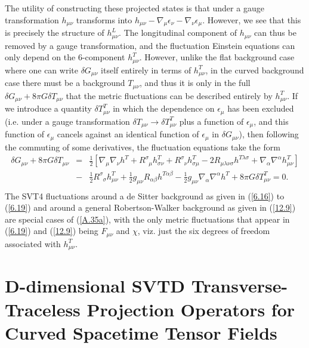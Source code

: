 The utility of constructing these projected states is that under a gauge transformation $h_{\mu\nu}$ transforms into $h_{\mu\nu}-\nabla_{\mu}\epsilon_{\nu}-\nabla_{\nu}\epsilon_{\mu}$. However, we see that this is precisely the structure of $h^{L}_{\mu\nu}$. The longitudinal component of $h_{\mu\nu}$ can thus be removed by a gauge transformation, and the fluctuation Einstein equations can only depend on the 6-component $h^{T}_{\mu\nu}$. However, unlike the flat background case where one can write $\delta G_{\mu\nu}$ itself entirely in terms of $h^T_{\mu\nu}$, in the curved background case there must be a background $T_{\mu\nu}$, and thus it is only in the full $\delta G_{\mu\nu}+8\pi G \delta T_{\mu\nu}$ that the metric fluctuations can be described entirely by $h^T_{\mu\nu}$. If we introduce a quantity $\delta T^T_{\mu\nu}$ in which the dependence on $\epsilon_{\mu}$ has been excluded (i.e. under a gauge transformation $\delta T_{\mu\nu}\rightarrow \delta T^T_{\mu\nu}$ plus a function of $\epsilon_{\mu}$, and this function of $\epsilon_{\mu}$ cancels against an identical function of $\epsilon_{\mu}$ in $\delta G_{\mu\nu}$), then following the commuting of some derivatives,  the fluctuation equations take the form \cite{mannheim_2005}
%
\begin{eqnarray} 
\delta G_{\mu\nu}+8\pi G \delta T_{\mu\nu}
&=&\frac{1}{2}[\nabla_{\mu}\nabla_{\nu}h^{T}
+R^{\sigma}_{\phantom{\sigma}\mu}h_{\sigma\nu}^{T}
+R^{\sigma}_{\phantom{\sigma}\nu}h_{\sigma\mu}^{T}
-2R_{\mu\lambda\nu\sigma}h^{T\lambda\sigma}
+\nabla_{\alpha}\nabla^{\alpha}h_{\mu\nu}^{T}]
\nonumber \\
&-&\frac{1}{2}R^{\sigma}_{\phantom{\sigma}\sigma}h^{T}_{\mu\nu}
+\frac{1}{ 2}g_{\mu\nu}R_{\alpha\beta}h^{T\alpha\beta}
-\frac{1}{2}g_{\mu\nu}\nabla_{\alpha}\nabla^{\alpha}h^{T}
+8\pi G \delta T^T_{\mu\nu}=0.
\nonumber\\
\label{A.35a}
\end{eqnarray}
% 
The SVT4 fluctuations around a de Sitter background as given in (\ref{6.16}) to (\ref{6.19}) and around a general Robertson-Walker background as given in (\ref{12.9}) are special cases of (\ref{A.35a}), with the only metric fluctuations that appear in (\ref{6.19}) and (\ref{12.9}) being $F_{\mu\nu}$ and $\chi$, viz. just the six degrees of freedom associated with $h^T_{\mu\nu}$.


\section{D-dimensional SVTD Transverse-Traceless Projection Operators for Curved Spacetime Tensor Fields}
\label{aas:tt_curved_proj}

